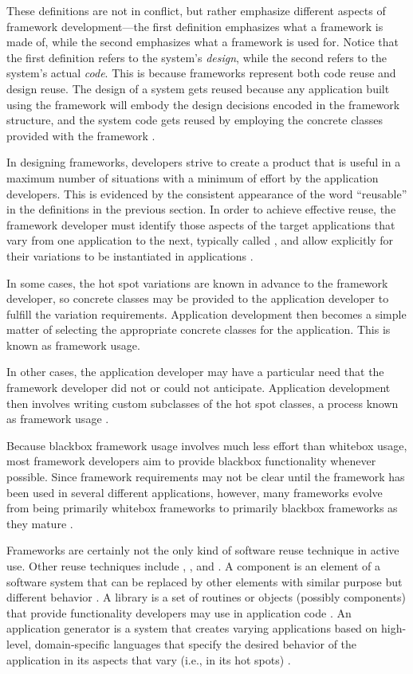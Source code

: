 These definitions are not in conflict, but rather emphasize different
aspects of framework development---the first definition emphasizes
what a framework is made of, while the second emphasizes what a
framework is used for.  Notice that the first definition refers to the
system's \emph{design}, while the second refers to the system's actual
\emph{code}.  This is because frameworks represent both code reuse and
design reuse.  The design of a system gets reused because any
application built using the framework will embody the design decisions
encoded in the framework structure, and the system code gets reused by
employing the concrete classes provided with the framework
\cite[ch. 1]{gamma:95}.

In designing frameworks, developers strive to create a product that is
useful in a maximum number of situations with a minimum of effort by
the application developers.  This is evidenced by the consistent
appearance of the word ``reusable'' in the definitions in the previous
section.  In order to achieve effective reuse,
the framework developer must identify those aspects of the target
applications that vary from one application to the next, typically
called , and allow explicitly for their variations to
be instantiated in applications \cite[ch. 14]{fayad:99}
\cite{demeyer:97}.

In some cases, the hot spot
variations are known in advance to the framework developer, so
concrete classes may be provided to the application developer to
fulfill the variation requirements.  Application development then
becomes a simple matter of selecting the appropriate concrete classes
for the application.  This is known as  framework
usage.

In other cases, the application developer may have a particular need
that the framework developer did not or could not anticipate.
Application development then involves writing custom subclasses of the
hot spot classes, a process known as  framework
usage \cite[ch. 1]{fayad:99}.

Because blackbox framework usage involves much less effort than
whitebox usage, most framework developers aim to provide blackbox
functionality whenever possible.  Since framework requirements may not
be clear until the framework has been used in several different
applications, however, many frameworks evolve from being primarily
whitebox frameworks to primarily blackbox frameworks as they
mature \cite[ch. 6]{gamma:95}.

Frameworks are certainly not the only kind of software reuse technique
in active use.  Other reuse techniques include ,
, and .  A component is
an element of a software system that can be replaced by other elements
with similar purpose but different behavior \cite{johnson:97}.  A
library is a set of routines or objects (possibly components) that
provide functionality developers may use in application
code \cite[ch. 1]{fayad:99}.  An application generator is a system
that creates varying applications based on high-level, domain-specific
languages that specify the desired behavior of the application in its
aspects that vary (i.e., in its hot spots) \cite[ch. 1]{fayad:99}.


